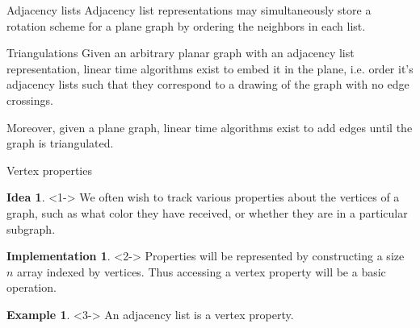 \documentclass[pdf]{beamer}
\theoremstyle{definition}
\theoremstyle{definition}
\theoremstyle{definition}
\theoremstyle{definition}
\theoremstyle{definition}
\theoremstyle{definition}
\newtheorem{imp}{Implementation}
\theoremstyle{definition}
\theoremstyle{definition}
\newtheorem{exm}{Example}
\theoremstyle{definition}
\newtheorem{ida}{Idea}
\theoremstyle{definition}
\theoremstyle{definition}
\theoremstyle{definition}
\begin{document}
\begin{frame}{Adjacency lists}
Adjacency list representations may simultaneously store a rotation scheme for
a plane graph by ordering the neighbors in each list.

\begin{center}
\end{center}
\end{frame}

\begin{frame}{Triangulations}
Given an arbitrary planar graph with an adjacency list representation, linear
time algorithms exist to embed it in the plane, i.e. order it's adjacency lists
such that they correspond to a drawing of the graph with no edge crossings.

Moreover, given a plane graph, linear time algorithms exist to add edges until
the graph is triangulated.
\end{frame}

\begin{frame}{Vertex properties}
\begin{ida}<1->
We often wish to track various properties about the vertices of a graph,
such as what color they have received, or whether they are in a particular
subgraph.
\end{ida}

\begin{imp}<2->
Properties will be represented by constructing a size $n$ array indexed by
vertices. Thus accessing a vertex property will be a basic operation.
\end{imp}

\begin{exm}<3->
An adjacency list is a vertex property.
\end{exm}
\end{frame}
\end{document}

